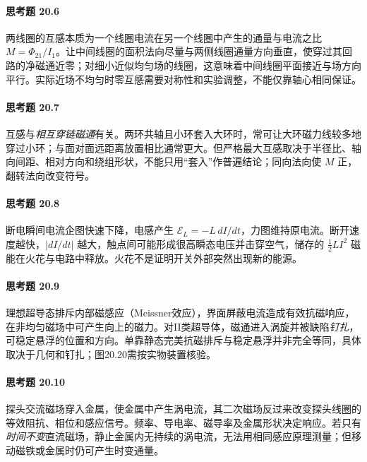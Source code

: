 \paragraph{思考题 20.6}
两线圈的互感本质为一个线圈电流在另一个线圈中产生的通量与电流之比 \(M=\Phi_{21}/I_1\)。让中间线圈的面积法向尽量与两侧线圈通量方向垂直，使穿过其回路的净磁通近零；对细小近似均匀场的线圈，这意味着中间线圈平面接近与场方向平行。实际近场不均匀时零互感需要对称性和实验调整，不能仅靠轴心相同保证。

\paragraph{思考题 20.7}
互感与\emph{相互穿链磁通}有关。两环共轴且小环套入大环时，常可让大环磁力线较多地穿过小环；与面对面远距离放置相比通常更大。但严格最大互感取决于半径比、轴向间距、相对方向和绕组形状，不能只用“套入”作普遍结论；同向法向使 \(M\) 正，翻转法向改变符号。

\paragraph{思考题 20.8}
断电瞬间电流企图快速下降，电感产生 \(\boxed{\mathcal E_L=-L\,dI/dt}\)，力图维持原电流。断开速度越快，\(|dI/dt|\) 越大，触点间可能形成很高瞬态电压并击穿空气，储存的 \(\tfrac12 LI^2\) 磁能在火花与电路中释放。火花不是证明开关外部突然出现新的能源。

\paragraph{思考题 20.9}
理想超导态排斥内部磁感应（Meissner效应），界面屏蔽电流造成有效抗磁响应，在非均匀磁场中可产生向上的磁力。对II类超导体，磁通进入涡旋并被缺陷\emph{钉扎}，可稳定悬浮的位置和方向。单靠静态完美抗磁排斥与稳定悬浮并非完全等同，具体取决于几何和钉扎；图20.20需按实物装置核验。

\paragraph{思考题 20.10}
探头交流磁场穿入金属，使金属中产生涡电流，其二次磁场反过来改变探头线圈的等效阻抗、相位和感应信号。频率、导电率、磁导率及金属形状决定响应。若只有\emph{时间不变}直流磁场，静止金属内无持续的涡电流，无法用相同感应原理测量；但移动磁铁或金属时仍可产生时变通量。
